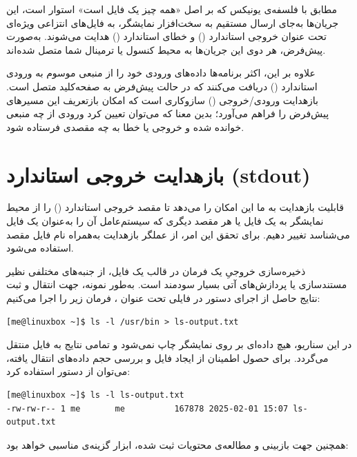 مطابق با فلسفه‌ی یونیکس که بر اصل «همه چیز یک فایل است» استوار است، این جریان‌ها به‌جای ارسال مستقیم به سخت‌افزار نمایشگر، به فایل‌های انتزاعی ویژه‌ای تحت عنوان خروجی استاندارد () و خطای استاندارد () هدایت می‌شوند. به‌صورت پیش‌فرض، هر دوی این جریان‌ها به محیط کنسول یا ترمینال شما متصل شده‌اند.

علاوه بر این، اکثر برنامه‌ها داده‌های ورودی خود را از منبعی موسوم به ورودی استاندارد () دریافت می‌کنند که در حالت پیش‌فرض به صفحه‌کلید متصل است. بازهدایت ورودی/خروجی () سازوکاری است که امکان بازتعریف این مسیرهای پیش‌فرض را فراهم می‌آورد؛ بدین معنا که می‌توان تعیین کرد ورودی از چه منبعی خوانده شده و خروجی یا خطا به چه مقصدی فرستاده شود.

\section{بازهدایت خروجی استاندارد (stdout)}

قابلیت بازهدایت به ما این امکان را می‌دهد تا مقصد خروجی استاندارد () را از محیط نمایشگر به یک فایل یا هر مقصد دیگری که سیستم‌عامل آن را به‌عنوان یک فایل می‌شناسد تغییر دهیم. برای تحقق این امر، از عملگر بازهدایت \cmd{>} به‌همراه نام فایل مقصد استفاده می‌شود.

ذخیره‌سازی خروجیِ یک فرمان در قالب یک فایل، از جنبه‌های مختلفی نظیر مستندسازی یا پردازش‌های آتی بسیار سودمند است. به‌طور نمونه، جهت انتقال و ثبت نتایج حاصل از اجرای دستور  در فایلی تحت عنوان ، فرمان زیر را اجرا می‌کنیم:

\begin{latin}
\begin{lstlisting}
[me@linuxbox ~]$ ls -l /usr/bin > ls-output.txt
\end{lstlisting}
\end{latin}

در این سناریو، هیچ داده‌ای بر روی نمایشگر چاپ نمی‌شود و تمامی نتایج به فایل  منتقل می‌گردد. برای حصول اطمینان از ایجاد فایل و بررسی حجم داده‌های انتقال یافته، می‌توان از دستور  استفاده کرد:

\begin{latin}
\begin{lstlisting}
[me@linuxbox ~]$ ls -l ls-output.txt
-rw-rw-r-- 1 me       me          167878 2025-02-01 15:07 ls-output.txt
\end{lstlisting}
\end{latin}

همچنین جهت بازبینی و مطالعه‌ی محتویات ثبت شده، ابزار  گزینه‌ی مناسبی خواهد بود:

